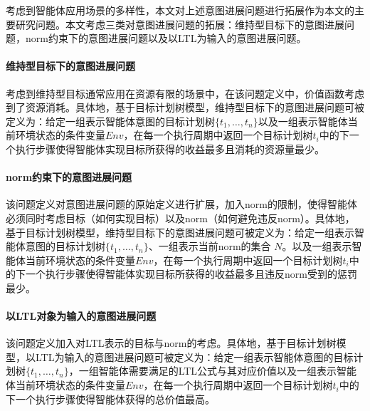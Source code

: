 考虑到智能体应用场景的多样性，本文对上述意图进展问题进行拓展作为本文的主要研究问题。本文考虑三类对意图进展问题的拓展：维持型目标下的意图进展问题，norm约束下的意图进展问题以及以LTL为输入的意图进展问题。

\paragraph{维持型目标下的意图进展问题}
考虑到维持型目标通常应用在资源有限的场景中，在该问题定义中，价值函数考虑到了资源消耗。具体地，基于目标计划树模型，维持型目标下的意图进展问题可被定义为：给定一组表示智能体意图的目标计划树$\{t_1, \dots, t_n\}$以及一组表示智能体当前环境状态的条件变量$Env$，在每一个执行周期中返回一个目标计划树$t_i$中的下一个执行步骤使得智能体实现目标所获得的收益最多且消耗的资源量最少。
\paragraph{norm约束下的意图进展问题}
该问题定义对意图进展问题的原始定义进行扩展，加入norm的限制，使得智能体必须同时考虑目标（如何实现目标）以及norm（如何避免违反norm）。具体地，基于目标计划树模型，维持型目标下的意图进展问题可被定义为：给定一组表示智能体意图的目标计划树$\{t_1, \dots, t_n\}$、一组表示当前norm的集合 $N$。以及一组表示智能体当前环境状态的条件变量$Env$，在每一个执行周期中返回一个目标计划树$t_i$中的下一个执行步骤使得智能体实现目标所获得的收益最多且违反norm受到的惩罚最少。
\paragraph{以LTL对象为输入的意图进展问题}
该问题定义加入对LTL表示的目标与norm的考虑。具体地，基于目标计划树模型，以LTL为输入的意图进展问题可被定义为：给定一组表示智能体意图的目标计划树$\{t_1, \dots, t_n\}$，一组智能体需要满足的LTL公式与其对应价值以及一组表示智能体当前环境状态的条件变量$Env$，在每一个执行周期中返回一个目标计划树$t_i$中的下一个执行步骤使得智能体获得的总价值最高。
